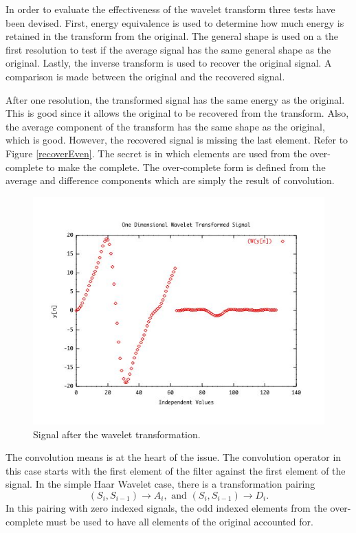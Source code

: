 In order to evaluate the effectiveness of the wavelet transform three
tests have been devised.  First, energy equivalence is used to
determine how much energy is retained in the transform from the
original.  The general shape is used on a the first resolution to test
if the average signal has the same general shape as the original.
Lastly, the inverse transform is used to recover the original signal.
A comparison is made between the original and the recovered signal.

After one resolution, the transformed signal has the same energy as
the original.  This is good since it allows the original to be
recovered from the transform.  Also, the average component of the
transform has the same shape as the original, which is good.  However,
the recovered signal is missing the last element.  Refer to Figure
\ref{recoverEven}. The secret is in which elements are used from the
over-complete to make the complete.  The over-complete form is defined
from the average and difference components which are simply the result
of convolution.

\begin{figure}
\begin{center}\includegraphics [width=6in]{haar1d.jpg} \end{center}
\caption{\label{wavelet_sample}
Signal after the wavelet transformation.}	
\end{figure}


The convolution means is at the heart of the issue.  The convolution operator in this case starts with the first element of the filter against the first element of the signal.  In the simple Haar Wavelet case, there is a transformation pairing
\[
(S_i , S_{i-1}) \rightarrow A_i, \mbox{ and } (S_i , S_{i-1}) \rightarrow D_i .
\]
In this pairing with zero indexed signals, the odd indexed elements from the over-complete must be used to have all elements of the original accounted for.   

